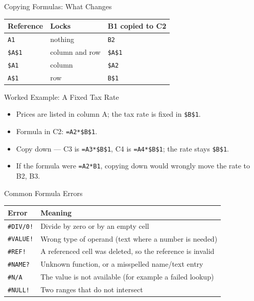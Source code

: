 \documentclass[aspectratio=169]{beamer}
\begin{document}
\begin{frame}{Copying Formulas: What Changes}
  \begin{center}
    \begin{tabular}{p{}p{}p{}}
      \toprule
      \textbf{Reference} & \textbf{Locks} & \textbf{B1 copied to C2} \\
      \midrule
      \texttt{A1} & nothing & \texttt{B2} \\
      \texttt{\$A\$1} & column and row & \texttt{\$A\$1} \\
      \texttt{\$A1} & column & \texttt{\$A2} \\
      \texttt{A\$1} & row & \texttt{B\$1} \\
      \bottomrule
    \end{tabular}
  \end{center}
  \vspace{0.25cm}
\end{frame}

\begin{frame}{Worked Example: A Fixed Tax Rate}
  \begin{itemize}
    \item Prices are listed in column A; the tax rate is fixed in
      \texttt{\$B\$1}.
    \item Formula in C2: \texttt{=A2*\$B\$1}.
    \item Copy down --- C3 is \texttt{=A3*\$B\$1}, C4 is \texttt{=A4*\$B\$1};
      the rate stays \texttt{\$B\$1}.
    \item If the formula were \texttt{=A2*B1}, copying down would wrongly move
      the rate to B2, B3.
  \end{itemize}
\end{frame}

\begin{frame}{Common Formula Errors}
  \begin{center}
    \begin{tabular}{p{}p{}}
      \toprule
      \textbf{Error} & \textbf{Meaning} \\
      \midrule
      \texttt{\#DIV/0!} & Divide by zero or by an empty cell \\
      \texttt{\#VALUE!} & Wrong type of operand (text where a number is needed) \\
      \texttt{\#REF!} & A referenced cell was deleted, so the reference is invalid \\
      \texttt{\#NAME?} & Unknown function, or a misspelled name/text entry \\
      \texttt{\#N/A} & The value is not available (for example a failed lookup) \\
      \texttt{\#NULL!} & Two ranges that do not intersect \\
      \bottomrule
    \end{tabular}
  \end{center}
\end{frame}
\end{document}
